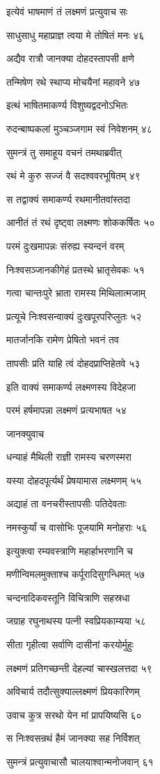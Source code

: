 इत्येवं भाषमाणं तं लक्ष्मणं प्रत्युवाच सः

साधुसाधु महाप्राज्ञ त्वया मे तोषितं मनः ४६

अद्यैव रात्रौ जानक्या दोहदस्तापसी क्षणे

तन्मिषेण रथे स्थाप्य मोचयैनां महावने ४७

इत्थं भाषितमाकर्ण्य विशुष्यद्वदनोऽभितः

रुदन्बाष्पकलां मुञ्चञ्जगाम स्वं निवेशनम् ४८

सुमन्त्रं तु समाहूय वचनं तमथाब्रवीत्

रथं मे कुरु सज्जं वै सदश्ववरभूषितम् ४९

स तद्वाक्यं समाकर्ण्य रथमानीतवांस्तदा

आनीतं तं रथं दृष्ट्वा लक्ष्मणः शोककर्षितः ५०

परमं दुःखमापन्नः संरुह्य स्यन्दनं वरम्

निःश्वसञ्जानकीगेहं प्रतस्थे भ्रातृसेवकः ५१

गत्वा चान्तःपुरे भ्राता रामस्य मिथिलात्मजाम्

प्रत्यूचे निःश्वसन्वाक्यं दुःखपूरपरिप्लुतः ५२

मातर्जानकि रामेण प्रेषितो भवनं तव

तापसीः प्रति याहि त्वं दोहदप्राप्तिहेतवे ५३

इति वाक्यं समाकर्ण्य लक्ष्मणस्य विदेहजा

परमं हर्षमापन्ना लक्ष्मणं प्रत्यभाषत ५४

जानक्युवाच

धन्याहं मैथिली राज्ञी रामस्य चरणस्मरा

यस्या दोहदपूर्त्यर्थं प्रेषयामास लक्ष्मणम् ५५

अद्याहं ता वनचरीस्तापसीः पतिदेवताः

नमस्कुर्यां च वासोभिः पूजयामि मनोहराः ५६

इत्युक्त्वा रम्यवस्त्राणि महार्हाभरणानि च

मणीन्विमलमुक्ताश्च कर्पूरादिसुगन्धिमत् ५७

चन्दनादिकवस्तूनि विचित्राणि सहस्रधा

जग्राह रघुनाथस्य पत्नी स्वप्रियकाम्यया ५८

सीता गृहीत्वा सर्वाणि दासीनां करयोर्मुहुः

लक्ष्मणं प्रतिगच्छन्ती देहल्यां चास्खलत्तदा ५९

अविचार्य तदौत्सुक्याल्लक्ष्मणं प्रियकारिणम्

उवाच कुत्र सरथो येन मां प्रापयिष्यसि ६०

स निःश्वसन्रथं हैमं जानक्या सह निर्विशत्

सुमन्त्रं प्रत्युवाचासौ चालयाश्वान्मनोजवान् ६१

